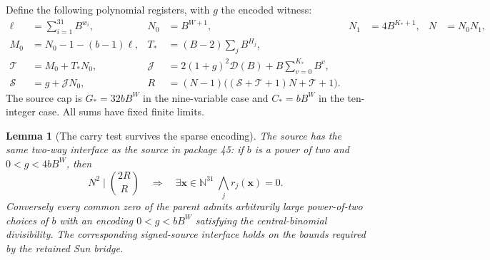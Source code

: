 \documentclass[11pt]{article}
\newcommand{\N}{\mathbb N}
\newtheorem{lemma}[theorem]{Lemma}
\theoremstyle{definition}\newtheorem{definition}[theorem]{Definition}
\theoremstyle{remark}\newtheorem{remark}[theorem]{Remark}
\begin{document}
Define the following polynomial registers, with $g$ the encoded witness:
\begin{align*}
 \ell&=\sum_{i=1}^{31}B^{w_i}, &
 N_0&=B^{W+1}, & N_1&=4B^{K_*+1}, & N&=N_0N_1,\\
 M_0&=N_0-1-(b-1)\ell, &
 T_*&=(B-2)\sum_jB^{H_j},\\
 \mathcal T&=M_0+T_*N_0, &
 \mathcal J&=2(1+g)^2\mathcal D(B)+B\sum_{v=0}^{K_*}B^v,\\
 \mathcal S&=g+\mathcal JN_0, &
 R&=(N-1)\bigl((\mathcal S+\mathcal T+1)N+\mathcal T+1\bigr).
\end{align*}
The source cap is $G_*=32bB^W$ in the nine-variable case and
$C_*=bB^W$ in the ten-integer case. All sums have fixed finite limits.

\begin{lemma}[The carry test survives the sparse encoding]
The source has the same two-way interface as the source in package 45:
if $b$ is a power of two and $0<g<4bB^W$, then
\[
 N^2\mid\binom{2R}{R}
 \quad\Longrightarrow\quad
 \exists\mathbf x\in\N^{31}\ \bigwedge_j r_j(\mathbf x)=0.
\]
Conversely every common zero of the parent admits arbitrarily large
power-of-two choices of $b$ with an encoding $0<g<bB^W$ satisfying the
central-binomial divisibility. The corresponding signed-source interface
holds on the bounds required by the retained Sun bridge.
\end{lemma}
\end{document}
